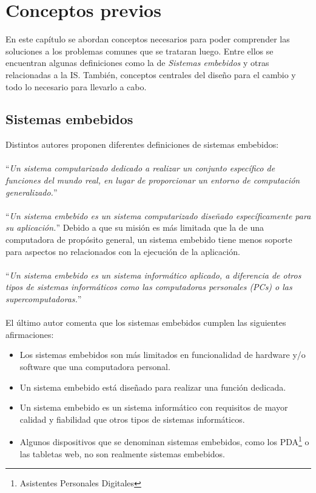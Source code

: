 \chapter{Conceptos previos}

En este capítulo se abordan conceptos necesarios para poder comprender las soluciones a los problemas comunes que se trataran luego. Entre ellos se encuentran algunas definiciones como la de \textit{Sistemas embebidos} y otras relacionadas a la IS. También, conceptos centrales del diseño para el cambio y todo lo necesario para llevarlo a cabo.


\section{Sistemas embebidos}
Distintos autores proponen diferentes definiciones de sistemas embebidos:
\\\\
\noindent
``\textit{Un sistema computarizado dedicado a realizar un conjunto específico de funciones del mundo real, en lugar de proporcionar un entorno de computación generalizado.}''~\cite{douglass}
\\\\
\noindent
``\textit{Un sistema embebido es un sistema computarizado diseñado específicamente para su aplicación.}'' Debido a que su misión es más limitada que la de una computadora de propósito general, un sistema embebido tiene menos soporte para aspectos no relacionados con la ejecución de la aplicación.~\cite{elecia}
\\\\
\noindent
``\textit{Un sistema embebido es un sistema informático aplicado, a diferencia de otros tipos de sistemas informáticos como las computadoras personales (PCs) o las supercomputadoras.}''~\cite{noergaard2005embedded}
\\\\
\noindent		
El último autor comenta que los sistemas embebidos cumplen las siguientes afirmaciones:
\begin{itemize}
	\item Los sistemas embebidos son más limitados en funcionalidad de hardware y/o software que una computadora personal.
	\item Un sistema embebido está diseñado para realizar una función dedicada.
	\item Un sistema embebido es un sistema informático con requisitos de mayor calidad y fiabilidad que otros tipos de sistemas informáticos.
	\item Algunos dispositivos que se denominan sistemas embebidos, como los PDA\footnote{Asistentes Personales Digitales} o las tabletas web, no son realmente sistemas embebidos.
\end{itemize}

